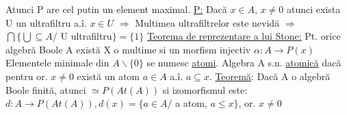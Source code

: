 \documentclass[twocolumn]{article}
\begin{document}
	Atunci P are cel putin un element maximal. \newline
	\underline{P:} Dacă $x \in A$, $x \neq 0$ atunci exista U un ultrafiltru a.î. $x \in U$ \newline
	$\Rightarrow$ Multimea ultrafiltrelor este nevidă \newline
	$\Rightarrow$ $\bigcap \{ \bigcup \subseteq A / $ U ultrafiltru$\} = \{ 1\}$ \newline
	\underline{Teorema de reprezentare a lui Stone:} \newline
	Pt. orice algebră Boole A există X o multime si un morfism injectiv $\alpha : A \rightarrow P(x)$ \newline
	Elementele minimale din $A \backslash \{ 0 \}$ se numesc \underline{atomi}. Algebra A s.n. \underline{atomică} dacă pentru or. $x \neq 0$ există un atom $a \in A$ a.î. $a \subseteq x$.
	\underline{Teoremă}: Dacă A o algebră Boole finită, atunci $\simeq P(A t(A))$ si izomorfismul este: $d: A \rightarrow P(A t(A)), d(x) = \{ a \in A /$ a atom, $a \leq x \}$, or. $x \neq 0$ \newline
\end{document}
